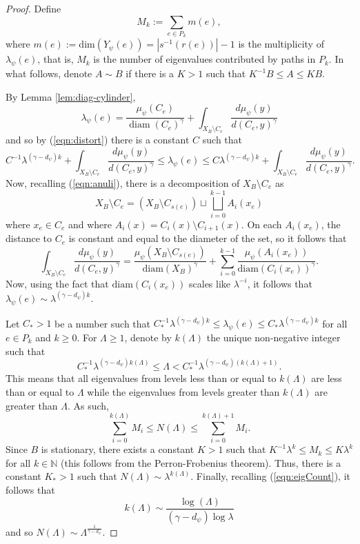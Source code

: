 \documentclass[12pt]{amsart}
\theoremstyle{plain}
\theoremstyle{definition}
\begin{document}
    \begin{proof}
        Define
        $$M_k:= \sum_{e\in P_k}m(e),$$
        where $m(e):=\mathrm{dim}(Y_\psi(e)) = |s^{-1}(r(e))|-1$ is the multiplicity of $\lambda_\psi(e)$, that is, 
        $M_k$ is the number of eigenvalues contributed by paths in $P_k$. In what follows, denote $A\sim B$ if there is a $K>1$ such that $K^{-1}B\leq A \leq K B $.
        
        By Lemma \ref{lem:diag-cylinder},
        $$\lambda_\psi(e) = \frac{\mu_\psi(C_e)}{\operatorname{diam}(C_e)^\gamma} +\int_{X_B\setminus C_e}\frac{d\mu_\psi(y)}{d(C_e,y)^\gamma}$$
    and so by (\ref{eqn:distort}) there is a constant $C$ such that 
    $$C^{-1} \lambda^{(\gamma-d_\psi)k}+\int_{X_B\setminus C_e}\frac{d\mu_\psi(y)}{d(C_e,y)^\gamma}\leq \lambda_\psi(e) \leq C \lambda^{(\gamma-d_\psi)k}+\int_{X_B\setminus C_e}\frac{d\mu_\psi(y)}{d(C_e,y)^\gamma}.$$
    Now, recalling (\ref{eqn:anuli}), there is a decomposition of $X_B\setminus C_e$ as
    $$X_B\setminus C_e = \left(X_B\setminus C_{s(e)}\right)\sqcup\bigsqcup_{i=0}^{k-1} A_i(x_e)$$
    where $x_e \in C_e$ and where $A_i(x) = C_i(x)\setminus C_{i+1}(x)$. On each $A_i(x_e)$, the distance to $C_e$ is constant and equal to the diameter of the set, so it follows that
    \begin{equation}
    \label{eqn:breakdown}
    \int_{X_B\setminus C_e}\frac{d\mu_\psi(y)}{d(C_e,y)^\gamma} = \frac{\mu_\psi(X_B\setminus C_{s(e)})}{\mathrm{diam}(X_B)^\gamma} + \sum_{i = 0 }^{k-1}\frac{\mu_\psi(A_i(x_e))}{\mathrm{diam}(C_i(x_e))^\gamma}.
    \end{equation}
    Now, using the fact that $\mathrm{diam}(C_i(x_e))$ scales like $\lambda^{-i}$, it follows that $\lambda_\psi(e)\sim \lambda^{(\gamma-d_\psi)k}$. 
    
    Let $C_*>1$ be a number such that $C_*^{-1} \lambda^{(\gamma-d_\psi)k}\leq \lambda_\psi(e)\leq C_* \lambda^{(\gamma-d_\psi)k}$ for all $e\in P_k$ and $k\geq 0$. For $\Lambda\geq 1$, denote by $k(\Lambda)$ the unique non-negative integer such that
    \begin{equation}
    \label{eqn:eigCount}
    C^{-1}_*\lambda^{(\gamma-d_\psi)k(\Lambda)}\leq \Lambda < C^{-1}_*\lambda^{(\gamma-d_\psi)(k(\Lambda)+1)}.
    \end{equation}
    This means that all eigenvalues from levels less than or equal to $k(\Lambda)$ are less than or equal to $\Lambda$ while the eigenvalues from levels greater than $k(\Lambda)$ are greater than $\Lambda$. As such,
    $$\sum_{i = 0}^{k(\Lambda)} M_i \leq N(\Lambda) \leq \sum_{i = 0}^{k(\Lambda)+1} M_i  .$$
    Since $B$ is stationary, there exists a constant $K>1$ such that
    $K^{-1} \lambda^{k}\leq M_k \leq K\lambda^{k}$
    for all $k\in\mathbb{N}$ (this follows from the Perron-Frobenius theorem). Thus, there is a constant $K_*>1$ such that $  N(\Lambda)\sim  \lambda^{k(\Lambda)}$.
    Finally, recalling (\ref{eqn:eigCount}), it follows that
    $$k(\Lambda) \sim \frac{\log(\Lambda)}{(\gamma-d_\psi)\log\lambda}$$
    and so $N(\Lambda)\sim \Lambda^{\frac{1}{\gamma-d_\psi}}$.    
    \end{proof}
\end{document}
